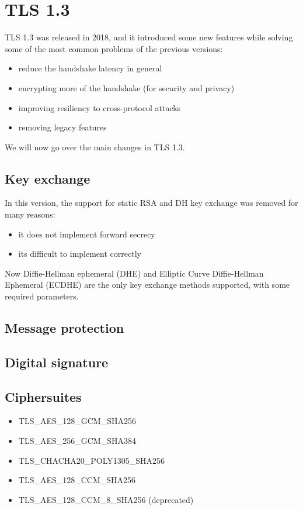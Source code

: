 \documentclass{report}
\begin{document}
\section{TLS 1.3}
TLS 1.3 was released in 2018, and it introduced some new features
while solving some of the most common problems of the previous 
versions:
\begin{itemize}
  \item reduce the handshake latency in general 
  \item encrypting more of the handshake (for security and privacy)
  \item improving resiliency to cross-protocol attacks
  \item removing legacy features
\end{itemize}
We will now go over the main changes in TLS 1.3.

\subsection{Key exchange}
In this version, the support for static RSA and DH key exchange was
removed for many reasons:
\begin{itemize}
  \item it does not implement forward secrecy 
  \item its difficult to implement correctly
\end{itemize}
Now Diffie-Hellman ephemeral (DHE) and Elliptic Curve Diffie-Hellman
Ephemeral (ECDHE) are the only key exchange methods supported, with
some required parameters.

\subsection{Message protection}

\subsection{Digital signature}

\subsection{Ciphersuites}
\begin{itemize}
  \item TLS\_AES\_128\_GCM\_SHA256
  \item TLS\_AES\_256\_GCM\_SHA384
  \item TLS\_CHACHA20\_POLY1305\_SHA256
  \item TLS\_AES\_128\_CCM\_SHA256
  \item TLS\_AES\_128\_CCM\_8\_SHA256 (deprecated)

\end{itemize}
\end{document}
